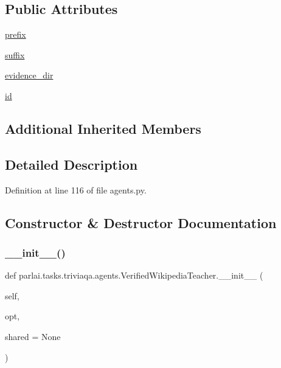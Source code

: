 \subsection*{Public Attributes}
\begin{DoxyCompactItemize}
\item 
\hyperlink{classparlai_1_1tasks_1_1triviaqa_1_1agents_1_1VerifiedWikipediaTeacher_a876c461eb0192fb040c30f4a2487c488}{prefix}
\item 
\hyperlink{classparlai_1_1tasks_1_1triviaqa_1_1agents_1_1VerifiedWikipediaTeacher_acc499929543ea473b7b298e28e22acab}{suffix}
\item 
\hyperlink{classparlai_1_1tasks_1_1triviaqa_1_1agents_1_1VerifiedWikipediaTeacher_a214e3d671d59a23a43315ccd367d8702}{evidence\+\_\+dir}
\item 
\hyperlink{classparlai_1_1tasks_1_1triviaqa_1_1agents_1_1VerifiedWikipediaTeacher_a37b2fd9a409408905a62cec4436774f2}{id}
\end{DoxyCompactItemize}
\subsection*{Additional Inherited Members}


\subsection{Detailed Description}


Definition at line 116 of file agents.\+py.



\subsection{Constructor \& Destructor Documentation}
\mbox{\label{classparlai_1_1tasks_1_1triviaqa_1_1agents_1_1VerifiedWikipediaTeacher_a6af307d6cf32536d5a860a0481bea4a5}} 
\subsubsection{\texorpdfstring{\+\_\+\+\_\+init\+\_\+\+\_\+()}{\_\_init\_\_()}}
{\footnotesize\ttfamily def parlai.\+tasks.\+triviaqa.\+agents.\+Verified\+Wikipedia\+Teacher.\+\_\+\+\_\+init\+\_\+\+\_\+ (\begin{DoxyParamCaption}\item[{}]{self,  }\item[{}]{opt,  }\item[{}]{shared = {\ttfamily None} }\end{DoxyParamCaption})}



